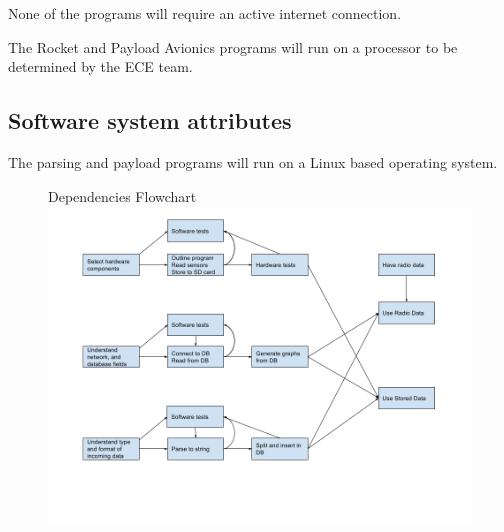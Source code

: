 \documentclass[onecolumn, draftclsnofoot, 10pt, compsoc]{IEEEtran}
\begin{document}
None of the programs will require an active internet connection.

The Rocket and Payload Avionics programs will run on a processor to be determined by the ECE team.

\subsection{Software system attributes}
The parsing and payload programs will run on a Linux based operating system.

\newpage
\begin{figure}
	\centering
    Dependencies Flowchart
	\includegraphics[scale=0.5\textwidth, natwidth=960, natheight=720]{dep_flowchart.png}
\end{figure}
\end{document}
